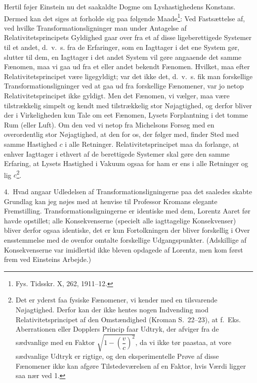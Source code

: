 \documentclass[12pt,a4paper]{article}
\newcommand{\opage}[1]{\marginnote{\footnotesize\textit{[#1]}}}
\begin{document}
Hertil føjer Einstein nu det saakaldte Dogme om Lyshastighedens
Konstans. Dermed kan det siges at forholde sig paa følgende
Maade\footnote{Fys. Tidsskr. X, 262, 1911--12.}: Ved Fastsættelse af,
ved hvilke Transformationsligninger man under Antagelse af
Relativitetsprincipets Gyldighed gaar over fra et af disse
ligeberettigede Systemer til et andet, d.~v.~s. fra de Erfaringer, som
en Iagttager i det ene System gør, slutter til dem, en Iagttager i det
andet System vil gøre angaaende det samme Fænomen, maa vi gaa ud fra et
eller andet bekendt Fænomen. Hvilket, maa efter Relativitetsprincipet
være ligegyldigt; var det ikke det, d.~v.~s. fik man forskellige
Transformationsligninger ved at gaa ud fra forskellige Fænomener, var
jo netop Relativitetsprincipet ikke gyldigt. Men det Fænomen, vi
vælger, maa være tilstrækkelig simpelt og kendt med tilstrækkelig stor
Nøjagtighed, og derfor bliver der i Virkeligheden kun Tale om eet
Fænomen, Lysets Forplantning i det tomme Rum (eller Luft). Om den ved
vi netop fra Michelsons Forsøg med en overordentlig stor Nøjagtighed,
at den for os, der følger med, finder Sted med samme Hastighed $c$ i
alle Retninger. Relativitetsprincipet maa da forlange, at enhver
Iagttager i ethvert af de berettigede Systemer skal gøre den samme
Erfaring, at Lysets Hastighed i Vakuum ogsaa for ham er ens i alle
Retninger og lig $c$\footnote{Det er yderst faa fysiske Fænomener, vi
kender med en tilsvarende Nøjagtighed. Derfor kan der ikke hentes nogen
Indvending mod Relativitetsprincipet af den Omstændighed (Kroman
S.~22--23), at f.~Eks. Aberrationen eller Dopplers Princip faar Udtryk,
der afviger fra de sædvanlige med en Faktor
$\sqrt{1-\left(\dfrac{v}{c}\right)^{2}}$, da vi ikke tør paastaa, at
vore sædvanlige Udtryk er rigtige, og den eksperimentelle Prøve af
disse Fænomener ikke kan afgøre Tilstedeværelsen af en Faktor, hvis
Værdi ligger saa nær ved 1.}.

4.\ Hvad angaar Udledelsen af Transformationsligningerne paa det
saaledes skabte Grundlag kan jeg nøjes med at henvise til Professor
Kromans elegante Fremstilling. Transformationsligningerne er identiske
med dem, Lorentz Aaret før havde opstillet; alle Konsekvenserne
(specielt alle iagttagelige Konsekvenser) bliver derfor ogsaa
identiske, det er kun Fortolkningen der bliver forskellig i Over\-%
\opage{21}%
\setcounter{footnote}{0}%
ensstemmelse med de ovenfor omtalte forskellige Udgangspunkter.
(Adskillige af Konsekvenserne var imidlertid ikke bleven opdagede af
Lorentz, men kom først frem ved Einsteins Arbejde.)
\end{document}
